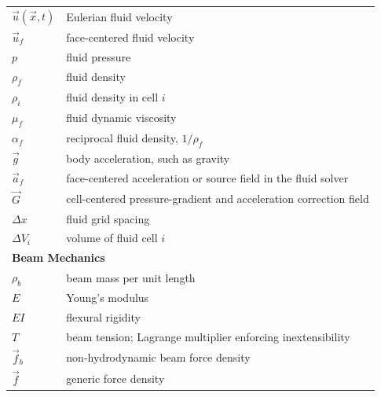 \begin{longtable}[l]{p{} p{}}
    $\vec u(\vec x,t)$     & Eulerian fluid velocity                                                 \\
    $\vec u_f$             & face-centered fluid velocity                                            \\
    $p$                    & fluid pressure                                                          \\
    $\rho_f$               & fluid density                                                           \\
    $\rho_i$               & fluid density in cell $i$                                               \\
    $\mu_f$                & fluid dynamic viscosity                                                 \\
    $\alpha_f$             & reciprocal fluid density, $1/\rho_f$                                    \\
    $\vec g$               & body acceleration, such as gravity                                      \\
    $\vec a_f$             & face-centered acceleration or source field in the fluid solver          \\
    $\vec G$               & cell-centered pressure-gradient and acceleration correction field        \\
    $\Delta x$             & fluid grid spacing                                                      \\
    $\Delta V_i$           & volume of fluid cell $i$                                                \\
    \multicolumn{2}{l}{\textbf{Beam Mechanics}}                                                      \\
    $\rho_b$               & beam mass per unit length                                               \\
    $E$                    & Young's modulus                                                         \\
    $EI$                   & flexural rigidity                                                       \\
    $T$                    & beam tension; Lagrange multiplier enforcing inextensibility             \\
    $\vec f_b$             & non-hydrodynamic beam force density                                     \\
    $\vec f$               & generic force density                                                   \\

\end{longtable}
